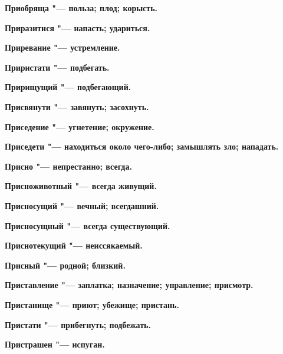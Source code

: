 \bfseries Приобряща \normalfont{} "--- польза; плод; корысть. 




\bfseries Приразитися \normalfont{} "--- напасть; удариться. 




\bfseries Приревание \normalfont{} "--- устремление. 




\bfseries Приристати \normalfont{} "--- подбегать. 




\bfseries Пририщущий \normalfont{} "--- подбегающий. 




\bfseries Присвянути \normalfont{} "--- завянуть; засохнуть. 




\bfseries Приседение \normalfont{} "--- угнетение; окружение. 




\bfseries Приседети \normalfont{} "--- находиться около чего-либо; замышлять зло; нападать. 




\bfseries Присно \normalfont{} "--- непрестанно; всегда. 




\bfseries Присноживотный \normalfont{} "--- всегда живущий. 




\bfseries Присносущий \normalfont{} "--- вечный; всегдашний. 




\bfseries Присносущный \normalfont{} "--- всегда существующий. 




\bfseries Приснотекущий \normalfont{} "--- неиссякаемый. 




\bfseries Присный \normalfont{} "--- родной; близкий. 




\bfseries Приставление \normalfont{} "--- заплатка; назначение; управление; присмотр. 




\bfseries Пристанище \normalfont{} "--- приют; убежище; пристань. 




\bfseries Пристати \normalfont{} "--- прибегнуть; подбежать. 




\bfseries Пристрашен \normalfont{} "--- испуган. 




